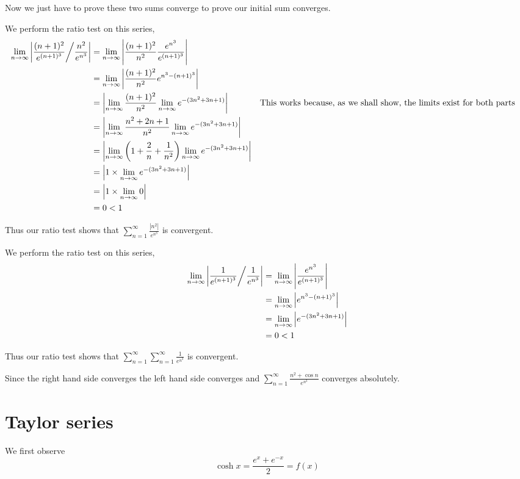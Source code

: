 \documentclass{article}
\begin{document}
Now we just have to prove these two sums converge to prove our initial sum
converges.

We perform the ratio test on this series,
\begin{align*}
    \lim_{n \to \infty} \left| \frac{(n+1)^2}{e^{(n+1)^3}} \middle/ \frac{n^2}{e^{n^3}} \right|
    &= \lim_{n \to \infty} \left| \frac{(n+1)^2}{n^2} \frac{e^{n^3}}{e^{(n+1)^3}} \right| \\
    &= \lim_{n \to \infty} \left| \frac{(n+1)^2}{n^2} e^{n^3-(n+1)^3} \right| \\
    &= \left| \lim_{n \to \infty} \frac{(n+1)^2}{n^2} \lim_{n \to \infty} e^{-(3n^2+3n+1)} \right|
    && \text{This works because, as we shall show, the limits exist for both parts} \\
    &= \left| \lim_{n \to \infty} \frac{n^2 + 2n + 1}{n^2} \lim_{n \to \infty} e^{-(3n^2+3n+1)} \right| \\
    &= \left| \lim_{n \to \infty} \left(1 + \frac{2}{n} + \frac{1}{n^2} \right) \lim_{n \to \infty} e^{-(3n^2+3n+1)} \right| \\
    &= \left| 1 \times \lim_{n \to \infty} e^{-(3n^2+3n+1)} \right| \\
    &= \left| 1 \times \lim_{n \to \infty} 0 \right| \\
    &= 0 < 1
\end{align*}

Thus our ratio test shows that $\sum_{n=1}^\infty \frac{\left| n^2 \right|}{e^{n^3}}$
is convergent.

We perform the ratio test on this series,
\begin{align*}
    \lim_{n \to \infty} \left| \frac{1}{e^{(n+1)^3}} \middle/ \frac{1}{e^{n^3}} \right|
    &= \lim_{n \to \infty} \left| \frac{e^{n^3}}{e^{(n+1)^3}} \right| \\
    &= \lim_{n \to \infty} \left| e^{n^3 - (n+1)^3} \right| \\
    &= \lim_{n \to \infty} \left| e^{-(3n^2 + 3n + 1)} \right| \\
    &= 0 < 1 \\
\end{align*}

Thus our ratio test shows that $\sum_{n=1}^\infty \sum_{n=1}^\infty \frac{1}{e^{n^3}}$
is convergent.

Since the right hand side converges the left hand side converges and
$\sum_{n=1}^\infty \frac{n^2 + \cos n}{e^{n^3}}$ converges absolutely.

\section{Taylor series}
We first observe
\[
    \cosh x = \frac{e^x + e^{-x}}{2} = f(x)
\]
\end{document}
